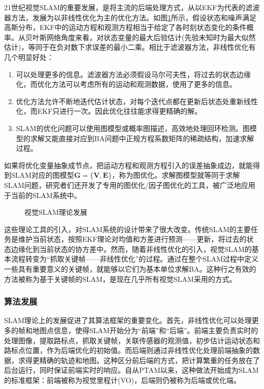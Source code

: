 21世纪视觉SLAM的重要发展，是将主流的后端处理方式，从以EKF为代表的滤波器方法，发展为以非线性优化为主的优化方法。如图\ref{fig1.1}所示，假设状态和噪声满足高斯分布，EKF中的运动方程和观测方程相当于给定了各时刻状态变化的条件概率。从贝叶斯网络角度来看，对状态变量的最大后验估计(先验未知时为最大似然估计)，等同于在负对数下求误差的最小二乘\upcite{[1.36]}。相比于滤波器方法，非线性优化有几个明显好处：
\begin{enumerate}[label={(\arabic*)}]
\item 可以处理更多的信息。滤波器方法必须假设马尔可夫性，将过去的状态边缘化，而优化方法可以考虑所有的运动和观测数据，使用了更多的信息。
\item 优化方法允许不断地迭代估计状态，对每个迭代点都在更新后状态处重新线性化，而EKF只进行一次。因此优化往往能求得更精确的解。
\item SLAM的优化问题可以使用图模型或概率图描述，高效地处理回环检测。图模型的求解又能直接对应到BA问题中正规方程系数矩阵的稀疏结构，加速求解过程。
\end{enumerate}

如果将优化变量抽象成节点，把运动方程和观测方程引入的误差抽象成边，就能得到SLAM对应的图模型$\boldsymbol{G}=\lbrace \boldsymbol{V}, \boldsymbol{E} \rbrace$，称为图优化\upcite{[1.37]}。求解图模型就等同于求解SLAM问题，研究者们还开发了专用的图优化/因子图优化的工具\upcite{[1.37],[1.38]}，被广泛地应用于当前的SLAM系统中。

\begin{figure}
    \centering
     \caption{视觉SLAM理论发展}
\label{fig1.1}
\end{figure}


这些理论工具的引入，对SLAM系统的设计带来了很大改变。传统SLAM的主要任务是维护当前状态，按照EKF理论对均值和方差进行预测——更新，将过去的状态边缘化到当前状态的协方差中。然而，随着非线性优化的引入，视觉SLAM的基本流程转变为“抓取关键帧——非线性优化”的过程。通过在整个SLAM过程中定义一些具有重要意义的关键帧，就能够以它们为基本单位求解BA。这种行之有效的方法被称为基于关键帧的SLAM，是现在几乎所有视觉SLAM采用的方式。



\subsubsection*{算法发展}
SLAM理论上的发展促进了其算法框架的重要变化。首先，非线性优化可以处理更多的帧和地图点信息，使得SLAM开始分为“前端”和“后端”。前端主要负责实时的处理图像，提取路标点，抓取关键帧，关联传感器的观测值，初步估计运动状态和路标点位置，作为后端优化的初始值。而后端则通过非线性优化处理前端抽象的数据，求得更精确的轨迹和地图。这种区分前后端的方式，把计算繁重的任务放在了后台运行，同时保证前端实时的响应。自从PTAM以来，这种做法开始成为SLAM的标准框架：前端被称为视觉里程计(VO)\upcite{[1.39]}，后端则仍被称为后端或优化端。

